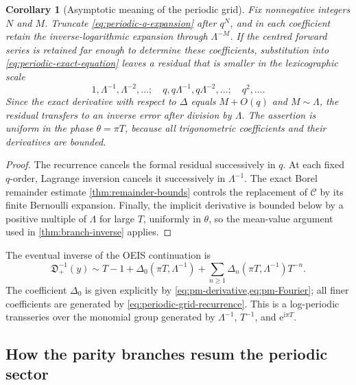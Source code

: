 \documentclass[11pt,a4paper,oneside]{article}
\theoremstyle{plain}
\newtheorem{corollary}[theorem]{Corollary}
\theoremstyle{definition}
\theoremstyle{remark}
\newcommand{\e}{\mathrm e}
\newcommand{\ii}{\mathrm i}
\newcommand{\DO}{\mathfrak D}
\begin{document}
\begin{corollary}[Asymptotic meaning of the periodic grid]
\label{cor:periodic-asymptotic-meaning}
Fix nonnegative integers $N$ and $M$.  Truncate
\cref{eq:periodic-q-expansion} after $q^N$, and in each coefficient retain the
inverse-logarithmic expansion through $\Lambda^{-M}$.  If the centred forward
series is retained far enough to determine these coefficients, substitution
into \cref{eq:periodic-exact-equation} leaves a residual that
is smaller in the lexicographic scale
\[
 1,\Lambda^{-1},\Lambda^{-2},\ldots;
 \quad q,q\Lambda^{-1},q\Lambda^{-2},\ldots;
 \quad q^2,\ldots .
\]
Since the exact derivative with respect to $\Delta$ equals
$M+O(q)$ and $M\sim\Lambda$, the residual transfers to an inverse error after
division by $\Lambda$.  The assertion is uniform in the phase
$\theta=\pi T$, because all trigonometric coefficients and their derivatives
are bounded.
\end{corollary}

\begin{proof}
The recurrence cancels the formal residual successively in $q$.  At each fixed
$q$-order, Lagrange inversion cancels it successively in $\Lambda^{-1}$.
The exact Borel remainder estimate \cref{thm:remainder-bounds} controls the
replacement of $\mathcal C$ by its finite Bernoulli expansion.  Finally, the
implicit derivative is bounded below by a positive multiple of $\Lambda$ for
large $T$, uniformly in $\theta$, so the mean-value argument used in
\cref{thm:branch-inverse} applies.
\end{proof}

\begin{summarybox}
The eventual inverse of the OEIS continuation is
\begin{equation}
 \DO_+^{-1}(y)
 \sim T-1+\Delta_0(\pi T,\Lambda^{-1})
 +\sum_{n\ge1}\Delta_n(\pi T,\Lambda^{-1})T^{-n}.
 \label{eq:periodic-full-transseries}
\end{equation}
The coefficient $\Delta_0$ is given explicitly by
\cref{eq:pm-derivative,eq:pm-Fourier}; all finer coefficients are generated by
\cref{eq:periodic-grid-recurrence}.  This is a log-periodic transseries over
the monomial group generated by $\Lambda^{-1}$, $T^{-1}$, and
$\e^{\ii\pi T}$.
\end{summarybox}

\subsection{How the parity branches resum the periodic sector}
\end{document}
